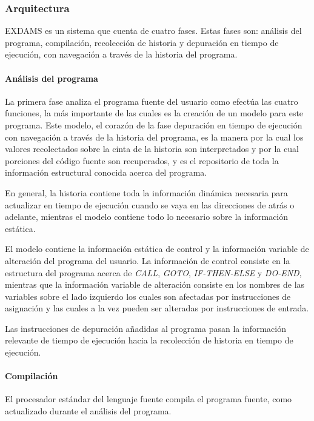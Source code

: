 \documentclass[12pt,legalpaper]{report}
\begin{document}
			\subsubsection{Arquitectura}

EXDAMS es un sistema que cuenta de cuatro fases.  Estas fases son: análisis del programa, compilación, recolección de historia y depuración en tiempo de ejecución, con navegación a través de la historia del programa.

				\paragraph{Análisis del programa}

La primera fase analiza el programa fuente del usuario como efectúa las cuatro funciones, la más importante de las cuales es la creación de un modelo para este programa.  Este modelo, el corazón de la fase depuración en tiempo de ejecución con navegación a través de la historia del programa, es la manera por la cual los valores recolectados sobre la cinta de la historia son interpretados y por la cual porciones del código fuente son recuperados, y es el repositorio de toda la información estructural conocida acerca del programa.

En general, la historia contiene toda la información dinámica necesaria para actualizar en tiempo de ejecución cuando se vaya en las direcciones de atrás o adelante, mientras el modelo contiene todo lo necesario sobre la información estática.

El modelo contiene la información estática de control y la información variable de alteración del programa del usuario.  La información de control consiste en la estructura del programa acerca de \textit{CALL}, \textit{GOTO}, \textit{IF-THEN-ELSE} y \textit{DO-END}, mientras que la información variable de alteración consiste en los nombres de las variables sobre el lado izquierdo los cuales son afectadas por instrucciones de asignación y las cuales a la vez pueden ser alteradas por instrucciones de entrada.

Las instrucciones de depuración añadidas al programa pasan la información relevante de tiempo de ejecución hacia  la recolección de historia en tiempo de ejecución.

				\paragraph{Compilación}

El procesador estándar del lenguaje fuente compila el programa fuente, como actualizado durante el análisis del programa.
\end{document}
